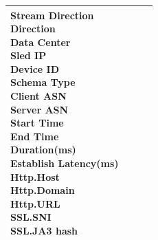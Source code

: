 \begin{description}
\begin{longtable}{p{}|p{}|p{}|p{}}
{                                                                                                    Stream Direction\\
                                                                                                    Direction\\
                                                                                                    Data Center\\
                                                                                                    Sled IP\\
                                                                                                    Device ID\\
                                                                                                    Schema Type\\
                                                                                                    Client ASN\\
                                                                                                    Server ASN\\
                                                                                                    Start Time\\
                                                                                                    End Time\\
                                                                                                    Duration(ms)\\
                                                                                                    Establish Latency(ms)\\
                                                                                                    Http.Host\\
                                                                                                    Http.Domain\\
                                                                                                    Http.URL\\
                                                                                                    SSL.SNI\\
                                                                                                    SSL.JA3 hash}  \\ \hline 

\end{longtable}
\end{description}
